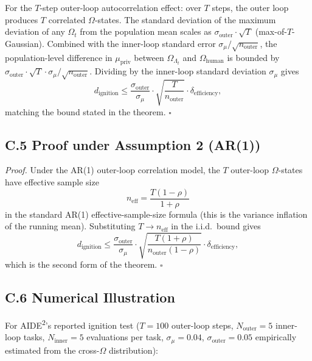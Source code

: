 \documentclass{article}
\theoremstyle{definition}
\begin{document}
For the $T$-step outer-loop autocorrelation effect: over $T$ steps, the outer loop produces $T$ correlated $\Omega$-states. The standard deviation of the maximum deviation of any $\Omega_t$ from the population mean scales as $\sigma_{\text{outer}} \cdot \sqrt{T}$ (max-of-$T$-Gaussian). Combined with the inner-loop standard error $\sigma_\mu / \sqrt{n_{\text{outer}}}$, the population-level difference in $\mu_{\text{priv}}$ between $\Omega_{\Lambda_t}$ and $\Omega_{\text{human}}$ is bounded by $\sigma_{\text{outer}} \cdot \sqrt{T} \cdot \sigma_\mu / \sqrt{n_{\text{outer}}}$. Dividing by the inner-loop standard deviation $\sigma_\mu$ gives
\[
d_{\text{ignition}} \le \frac{\sigma_{\text{outer}}}{\sigma_\mu} \cdot \sqrt{\frac{T}{n_{\text{outer}}}} \cdot \delta_{\text{efficiency}},
\]
matching the bound stated in the theorem. \hfill$\square$

\subsection*{C.5 Proof under Assumption 2 (AR(1))}

\textit{Proof.} Under the AR(1) outer-loop correlation model, the $T$ outer-loop $\Omega$-states have effective sample size
\[
n_{\text{eff}} = \frac{T (1 - \rho)}{1 + \rho}
\]
in the standard AR(1) effective-sample-size formula (this is the variance inflation of the running mean). Substituting $T \to n_{\text{eff}}$ in the i.i.d.\ bound gives
\[
d_{\text{ignition}} \le \frac{\sigma_{\text{outer}}}{\sigma_\mu} \cdot \sqrt{\frac{T(1+\rho)}{n_{\text{outer}}(1-\rho)}} \cdot \delta_{\text{efficiency}},
\]
which is the second form of the theorem. \hfill$\square$

\subsection*{C.6 Numerical Illustration}

For AIDE\textsuperscript{2}'s reported ignition test ($T = 100$ outer-loop steps, $N_{\text{outer}} = 5$ inner-loop tasks, $N_{\text{inner}} = 5$ evaluations per task, $\sigma_\mu = 0.04$, $\sigma_{\text{outer}} = 0.05$ empirically estimated from the cross-$\Omega$ distribution):
\end{document}
